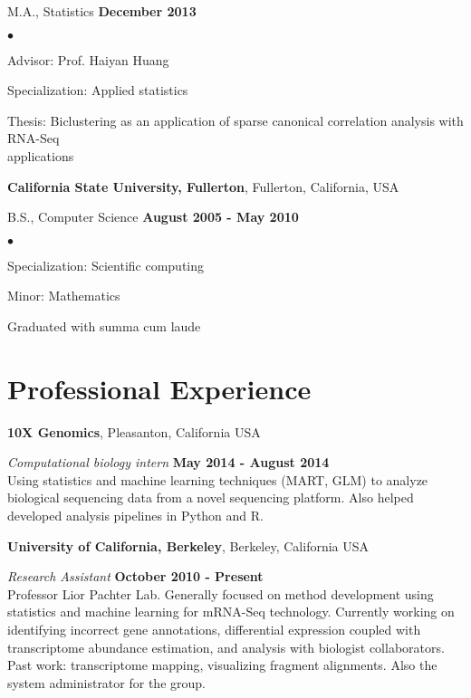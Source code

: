 \documentclass[margin,line]{res}
\newenvironment{list2}{
  \begin{list}{$\bullet$}{%
      \setlength{\itemsep}{0in}
      \setlength{\parsep}{0in} \setlength{\parskip}{0in}
      \setlength{\topsep}{0in} \setlength{\partopsep}{0in}
      \setlength{\leftmargin}{0.2in}}}{\end{list}}
\begin{document}
\begin{resume}
M.A., Statistics \hfill {\bf
 December 2013}\\
\vspace{-.45cm}
\begin{list2}
\vspace*{1mm}
\item Advisor: Prof. Haiyan Huang
\item Specialization: Applied statistics
\item Thesis: Biclustering as an application of sparse canonical correlation analysis with RNA-Seq \\applications
\end{list2}



{\bf California State University, Fullerton}, Fullerton, California, USA

\vspace{-.3cm}
B.S., Computer Science \hfill {\bf August 2005 - May 2010}\\
\vspace{-.45cm}
\begin{list2}
\vspace*{1mm}
\item Specialization: Scientific computing
\item Minor: Mathematics
\item Graduated with summa cum laude
\end{list2}

\section{\sc Professional Experience}

{\bf 10X Genomics}, Pleasanton, California USA
\vspace{-.3cm}

{\em Computational biology intern} \hfill {\bf May 2014 - August 2014}\\
Using statistics and machine learning techniques (MART, GLM) to analyze
biological sequencing data from a novel sequencing platform. Also helped
developed analysis pipelines in Python and R.

{\bf University of California, Berkeley}, Berkeley, California USA
\vspace{-.3cm}

{\em Research Assistant} \hfill {\bf October 2010 - Present}\\
Professor Lior Pachter Lab. Generally focused on method development using
statistics and machine learning for mRNA-Seq technology. Currently working on
identifying incorrect gene annotations, differential expression coupled with
transcriptome abundance estimation, and analysis with biologist collaborators.
Past work: transcriptome mapping, visualizing fragment alignments. Also the
system administrator for the group.


\end{resume}
\end{document}
